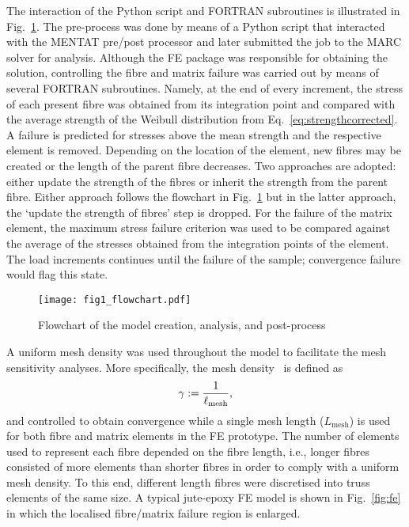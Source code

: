 	
	The interaction of the Python script and FORTRAN subroutines is illustrated in Fig.~\ref{fig:m}. The pre-process was done by means of a Python script that interacted with the MENTAT pre/post processor and later submitted the job to the MARC solver for analysis. Although the FE package was responsible for obtaining the solution, controlling the fibre and matrix failure was carried out by means of several FORTRAN subroutines. Namely, at the end of every increment, the stress of each present fibre was obtained from its integration point and compared with the average strength of the Weibull distribution from Eq.~\eqref{eq:strengthcorrected}. A failure is predicted for stresses above the mean strength and the respective element is removed. Depending on the location of the element, new fibres may be created or the length of the parent fibre decreases. Two approaches are adopted: either update the strength of the fibres or inherit the strength from the parent fibre. Either approach follows the flowchart in Fig.~\ref{fig:m} but in the latter approach, the `update the strength of fibres' step is dropped. For the failure of the matrix element, the maximum stress failure criterion was used to be compared against the average of the stresses obtained from the integration points of the element. The load increments continues until the failure of the sample; convergence failure would flag this state.
	
	\begin{figure}[!t]
	\centering
	\texttt{[image: fig1\_flowchart.pdf]}
	\caption{Flowchart of the model creation, analysis, and post-process}\label{fig:m}
	\end{figure}
	A uniform mesh density was used throughout the model to facilitate the mesh sensitivity analyses. More specifically, the mesh density~\autocite{Javanbakht.2016b} is defined as
	\begin{equation}
		\gamma\mathrel{:=}\frac{1}{\ell_\text{mesh}},
	\end{equation}
and controlled to obtain convergence while a single mesh length ($L_\text{mesh}$) is used for both fibre and matrix elements in the FE prototype. The number of elements used to represent each fibre depended on the fibre length, i.e., longer fibres consisted of more elements than shorter fibres in order to comply with a uniform mesh density. To this end, different length fibres were discretised into truss elements of the same size. A typical jute-epoxy FE model is shown in Fig.~\ref{fig:fe} in which the localised fibre/matrix failure region is enlarged.


